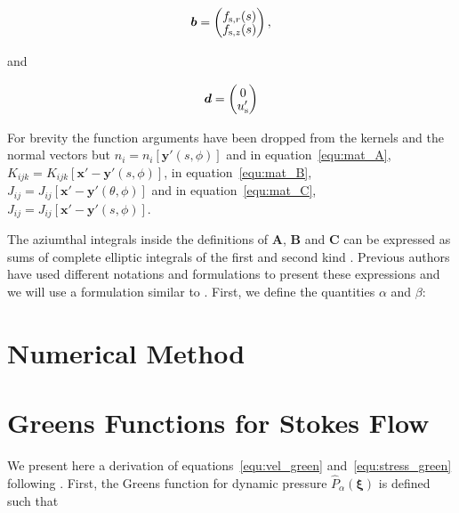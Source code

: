 \documentclass[12pt]{article}
\begin{document}
\begin{equation}
\setlength{\arraycolsep}{5pt}
\renewcommand{\arraystretch}{1.3}
\boldsymbol{b} = \left( \begin{matrix}
f_{\text{s},r}(s) \\[-5pt]
f_{\text{s},z}(s) \\
\end{matrix} \right)  ,
\label{equ:vec_b}
\end{equation}

and 

\begin{equation}
\setlength{\arraycolsep}{5pt}
\renewcommand{\arraystretch}{1.3}
\boldsymbol{d} = \left( \begin{matrix}
0 \\[-5pt]
u'_{\text{s}} \\
\end{matrix} \right) 
\label{equ:vec_d}
\end{equation}

For brevity the function arguments have been dropped from the kernels and the normal vectors but $n_{i} = n_{i}[\boldsymbol{y'}(s, \phi)]$ and in equation~\ref{equ:mat_A}, $K_{ijk} = K_{ijk}[\boldsymbol{x'} - \boldsymbol{y'}(s, \phi)]$, in equation~\ref{equ:mat_B}, $J_{ij} = J_{ij}[\boldsymbol{x'} - \boldsymbol{y'}(\theta, \phi)]$ and in equation~\ref{equ:mat_C}, $J_{ij} = J_{ij}[\boldsymbol{x'} - \boldsymbol{y'}(s, \phi)]$.

The aziumthal integrals inside the definitions of $\boldsymbol{A}$, $\boldsymbol{B}$ and $\boldsymbol{C}$ can be expressed as sums of complete elliptic integrals of the first and second kind \citep{Lee82, Geller86, Graziani89, Pozrikidis92, Manga94, Roumeliotis00}. Previous authors have used different notations and formulations to present these expressions and we will use a formulation similar to \citet{Graziani89}. First, we define the quantities $\alpha$ and $\beta$:


\section{Numerical Method}
\label{sec:num_meth}

\appendix

\section{Greens Functions for Stokes Flow}
\label{app:Greens}

We present here a derivation of equations~\ref{equ:vel_green} and~\ref{equ:stress_green} following \citet{Ladyzhenskaya63}. First, the Greens function for dynamic pressure $\hat{P}_{\alpha}(\boldsymbol{\xi})$ is defined such that
\end{document}
